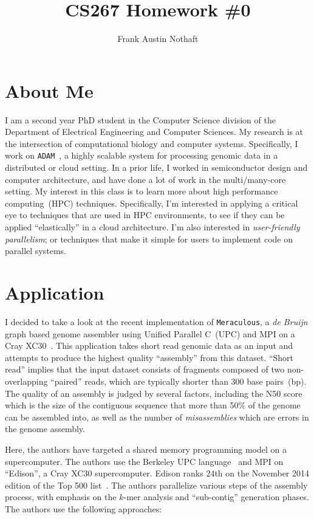 \documentclass[11pt]{article}
\begin{document}
\title{CS267 Homework \#0}
\author{Frank Austin Nothaft}
\date{}

\maketitle

\section{About Me}

I am a second year PhD student in the Computer Science division of the Department of Electrical
Engineering and Computer Sciences. My research is at the intersection of computational biology and
computer systems. Specifically, I work on \texttt{ADAM}~\cite{massie13}, a highly scalable system for
processing genomic data in a distributed or cloud setting. In a prior life, I worked in semiconductor design
and computer architecture, and have done a lot of work in the multi/many-core setting. My interest in this
class is to learn more about high performance computing~(HPC) techniques. Specifically, I'm interested in
applying a critical eye to techniques that are used in HPC environments, to see if they can be applied
``elastically'' in a cloud architecture. I'm also interested in \emph{user-friendly parallelism}; or techniques
that make it simple for users to implement code on parallel systems.

\section{Application}

I decided to take a look at the recent implementation of \texttt{Meraculous}, a \emph{de Bruijn} graph based
genome assembler using Unified Parallel C~(UPC) and MPI on a Cray XC30~\cite{georganas14}. This
application takes short read genomic data as an input and attempts to produce the highest quality
``assembly'' from this dataset. ``Short read'' implies that the input dataset consists of fragments composed
of two non-overlapping ``paired'' reads, which are typically shorter than 300 base pairs~(bp). The quality of
an assembly is judged by several factors, including the N50 score which is the size of the contiguous
sequence that more than 50\% of the genome can be assembled into, as well as the number of
\emph{misassemblies} which are errors in the genome assembly.

Here, the authors have targeted a shared memory programming model on a supercomputer. The authors
use the Berkeley UPC language~\cite{husbands03} and MPI on ``Edison'', a Cray XC30 supercomputer.
Edison ranks 24th on the November 2014 edition of the Top 500 list~\cite{edison}. The authors parallelize
various steps of the assembly process, with emphasis on the $k$-mer analysis and ``sub-contig''
generation phases. The authors use the following approaches:
\end{document}
